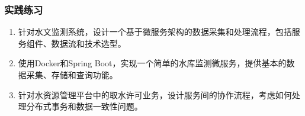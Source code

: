 \subsubsection{实践练习}\label{ux5b9eux8df5ux7ec3ux4e60}

\begin{enumerate}
\def\labelenumi{\arabic{enumi}.}
\item
  针对水文监测系统，设计一个基于微服务架构的数据采集和处理流程，包括服务组件、数据流和技术选型。
\item
  使用Docker和Spring
  Boot，实现一个简单的水库监测微服务，提供基本的数据采集、存储和查询功能。
\item
  针对水资源管理平台中的取水许可业务，设计服务间的协作流程，考虑如何处理分布式事务和数据一致性问题。
\end{enumerate}
